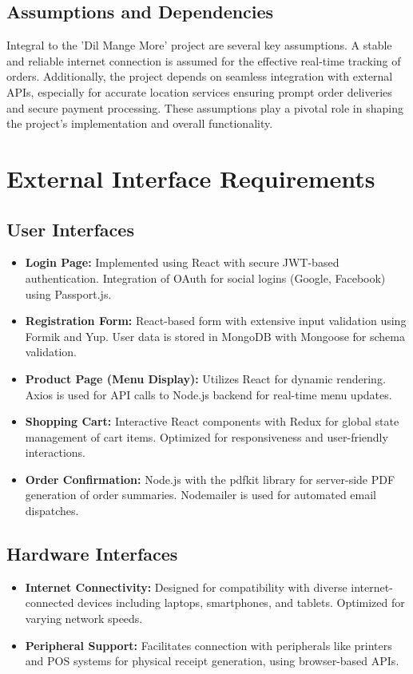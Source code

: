 \documentclass{article}
\begin{document}
\subsection{Assumptions and Dependencies}
Integral to the 'Dil Mange More' project are several key assumptions. A stable and reliable internet connection is assumed for the effective real-time tracking of orders. Additionally, the project depends on seamless integration with external APIs, especially for accurate location services ensuring prompt order deliveries and secure payment processing. These assumptions play a pivotal role in shaping the project's implementation and overall functionality.


\newpage
\newpage
\section{External Interface Requirements}
\subsection{User Interfaces}
\begin{itemize}
    \item \textbf{Login Page:} Implemented using React with secure JWT-based authentication. Integration of OAuth for social logins (Google, Facebook) using Passport.js.
    \item \textbf{Registration Form:} React-based form with extensive input validation using Formik and Yup. User data is stored in MongoDB with Mongoose for schema validation.
    \item \textbf{Product Page (Menu Display):} Utilizes React for dynamic rendering. Axios is used for API calls to Node.js backend for real-time menu updates.
    \item \textbf{Shopping Cart:} Interactive React components with Redux for global state management of cart items. Optimized for responsiveness and user-friendly interactions.
    \item \textbf{Order Confirmation:} Node.js with the pdfkit library for server-side PDF generation of order summaries. Nodemailer is used for automated email dispatches.
\end{itemize}

\subsection{Hardware Interfaces}
\begin{itemize}
    \item \textbf{Internet Connectivity:} Designed for compatibility with diverse internet-connected devices including laptops, smartphones, and tablets. Optimized for varying network speeds.
    \item \textbf{Peripheral Support:} Facilitates connection with peripherals like printers and POS systems for physical receipt generation, using browser-based APIs.
\end{itemize}
\end{document}
